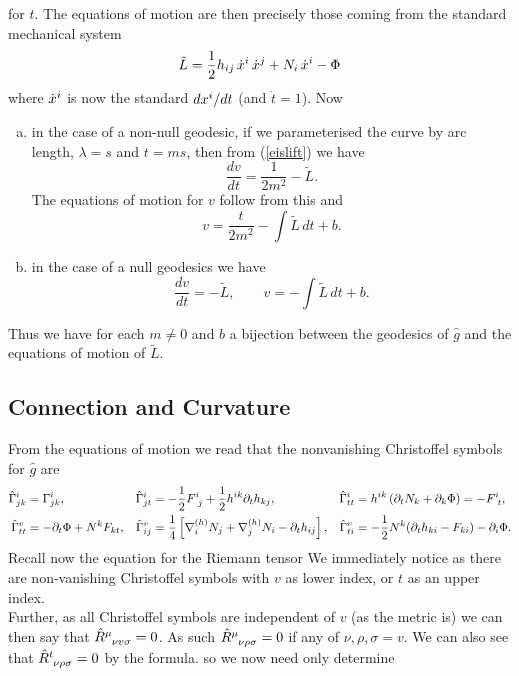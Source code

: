 \documentclass{article}
\begin{document}
for $t$. The equations of motion are then precisely those coming from the standard mechanical system
$$\tilde L= \frac12 h_{ij}\, \dot x\sp{i}\, \dot x\sp{j}+N_i \,\dot x\sp{i}-\Phi $$
where $ \dot x\sp{i}$ is now the standard $d x\sp{i}/dt$ (and $\dot t = 1$). Now
\begin{enumerate}[(a)]
	\item in the case of a non-null geodesic, if we parameterised the curve by arc length, $\lambda=s$ and $t =ms$, then from (\ref{eislift}) we have 
	$$\frac{dv}{dt}= \frac1{2m^2} -\tilde L.$$
	The equations of motion for $v$ follow from this and
	$$v=\frac{t}{2m^2}-\int \tilde L\, dt +b.$$
	\item in the case of a null geodesics we have
	$$\frac{dv}{dt}=  -\tilde L,\qquad  v=-\int \tilde L\, dt +b.$$
\end{enumerate}
Thus we have for each $m\ne0$ and $b$ a bijection between the geodesics of $\hat g$ and the
equations of motion of $\tilde L$.
\subsection{Connection and Curvature}
From the equations of motion we read that the nonvanishing Christoffel symbols for $\hat g$ are
\begin{align*}
\hat \Gamma\sp{i}_{jk}&=  \Gamma\sp{i}_{jk},
&\hat \Gamma\sp{i}_{jt}&=-\frac12 F\sp{i}_{\ j}+\frac12 h\sp{ik}\partial_t h_{kj},
&\hat \Gamma\sp{i}_{tt}&=h\sp{ik} \left( \partial_t N_k +\partial_{k} \Phi \right)= -F\sp{i}_{\ t},
\\
\hat \Gamma\sp{v}_{tt}&=-\partial_t \Phi+N\sp{k}F_{kt}, 
&\hat \Gamma\sp{v}_{ij}&=\frac14\left[\nabla\sp{(h)}_{i}N_{j}+\nabla\sp{(h)}_{j}N_{i}-\partial_t h_{ij}\right],
&\hat \Gamma\sp{v}_{ti}&=-\frac12 N\sp{k} (\partial_t h_{ki} -F_{ki}) -\partial_i\Phi .
\end{align*}
Recall now the equation for the Riemann tensor 
We immediately notice 
as there are non-vanishing Christoffel symbols with $v$ as lower index, or $t$ as an upper index. \\
Further, as all Christoffel symbols are independent of $v$ (as the metric is) we can then say that $\hat{R}\indices{^\mu_\nu_v_\sigma} = 0$. As such $\hat{R}\indices{^\mu_\nu_\rho_\sigma}=0$ if any of $\nu,\rho,\sigma=v$. We can also see that $\hat{R}\indices{^t_\nu_\rho_\sigma}=0$ by the formula. so we now need only determine
\end{document}
